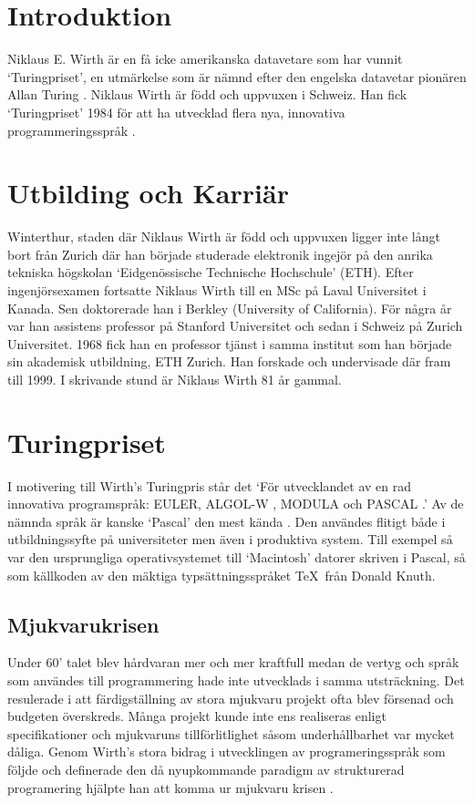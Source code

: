 \section{Introduktion}          %

Niklaus E. Wirth är en få icke amerikanska datavetare som har vunnit
`Turingpriset', en utmärkelse som är nämnd efter den engelska datavetar 
pionären Allan Turing \cite{TuringAward}. Niklaus Wirth är född och uppvuxen i Schweiz. Han fick 
`Turingpriset' 1984 för att ha utvecklad flera nya, innovativa
programmeringsspråk \cite{WirthAward}.

\section{Utbilding och Karriär}

Winterthur, staden där Niklaus Wirth är född och uppvuxen ligger inte långt bort 
från Zurich där han började studerade elektronik ingejör på den anrika
tekniska högskolan `Eidgenössische Technische Hochschule' (ETH). Efter 
ingenjörsexamen fortsatte Niklaus Wirth till en MSc på Laval Universitet i Kanada. 
Sen doktorerade han i Berkley (University of California). För några år var han  
assistens professor på Stanford Universitet och sedan i Schweiz på Zurich Universitet. 
1968 fick han en professor tjänst i samma institut som han började sin akademisk 
utbildning, ETH Zurich. Han forskade och undervisade där fram till 1999. I
skrivande stund är Niklaus Wirth 81 år gammal.   

\section{Turingpriset}
I motivering till Wirth's Turingpris står det `För utvecklandet av en rad 
innovativa programspråk: EULER, ALGOL-W \cite{ALGOL}, MODULA
\cite{modula} och PASCAL \cite{PASCAL}.' Av de nämnda språk 
är kanske `Pascal' den mest kända \cite{PASCAL}. Den användes flitigt både i utbildningssyfte 
på universiteter men även i produktiva system. Till exempel så var den ursprungliga
operativsystemet till `Macintosh' datorer skriven i Pascal, så som källkoden av
den mäktiga typsättningsspråket \TeX\ från Donald Knuth. 

\subsection{Mjukvarukrisen}
Under 60' talet blev hårdvaran mer och mer kraftfull medan de vertyg och språk som 
användes till programmering hade inte utvecklads i samma utsträckning. Det resulerade
i att färdigställning av stora mjukvaru projekt ofta blev försenad och budgeten
överskreds. Många projekt kunde inte ens realiseras enligt specifikationer 
och mjukvaruns tillförlitlighet såsom underhållbarhet var mycket
dåliga. Genom Wirth's stora bidrag i utvecklingen av programeringsspråk som följde
och definerade den då nyupkommande paradigm av strukturerad programering 
hjälpte han att komma ur mjukvaru krisen \cite{stepwise}.

